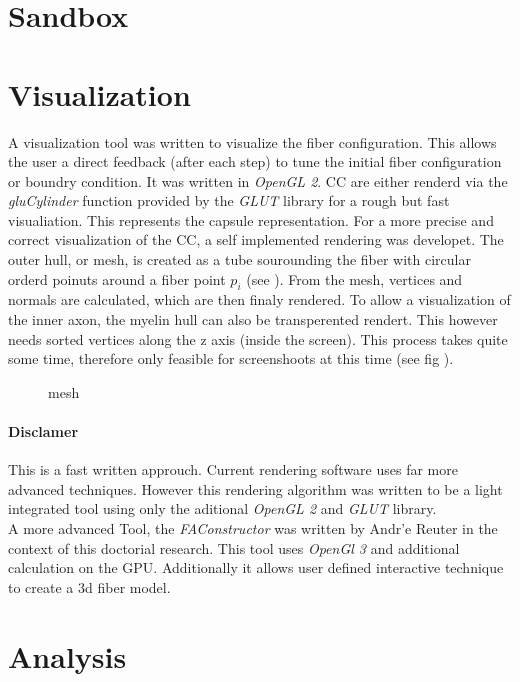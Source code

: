 \section{Sandbox}
% 
\section{Visualization}
% 
A visualization tool was written to visualize the fiber configuration. This allows the user a direct feedback (\eg after each step) to tune the initial fiber configuration or boundry condition. It was written in \textit{OpenGL 2}.
% 
\ac{CC} are either renderd via the \textit{gluCylinder} function provided by the \textit{GLUT} library for a rough but fast visualiation. This represents the capsule representation. For a more precise and correct visualization of the \ac{CC}, a self implemented rendering was developet. The outer hull, or mesh, is created as a tube sourounding the fiber with circular orderd poinuts around a fiber point $p_i$ (see \dummy).
% 
From the mesh, vertices and normals are calculated, which are then finaly rendered. To allow a visualization of the inner axon, the myelin hull can also be transperented rendert. This however needs sorted vertices along the z axis (inside the screen). This process takes quite some time, therefore only feasible for screenshoots at this time (see fig \dummy).
% 
\begin{figure}[!tb]
	\caption{mesh}
	\label{fig:vis_mesh}
\end{figure}
% 
\paragraph{Disclamer}
This is a fast written approuch. Current rendering software uses far more advanced techniques. However this rendering algorithm was written to be a light integrated tool using only the aditional \textit{OpenGL 2} and \textit{GLUT} library.\\
% 
A more advanced Tool, the \textit{FAConstructor} \cite{Reuter2019} was written by Andr'e Reuter in the context of this doctorial research. This tool uses \textit{OpenGl 3} and additional calculation on the GPU. Additionally it allows user defined interactive technique to create a 3d fiber model.
%  
%
% 
% 
\section{Analysis}
% 
% 
% 
% 
% 
% 
% 
